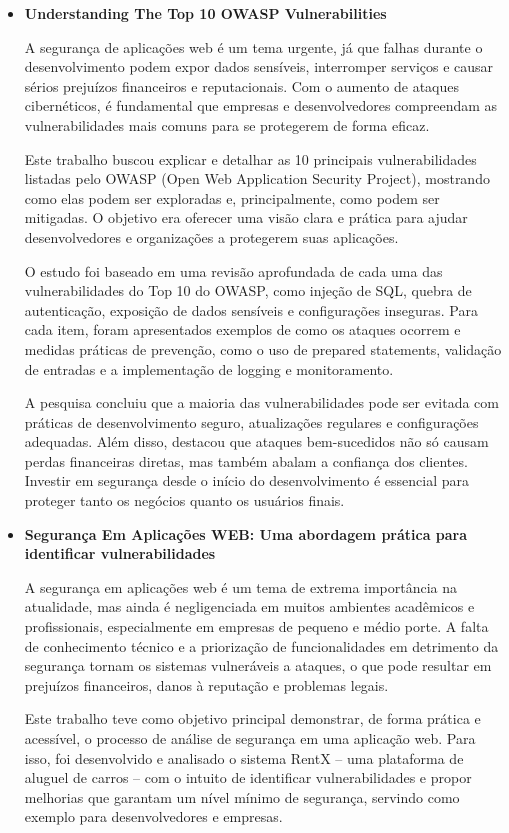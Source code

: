 \documentclass[12pt]{article}
\begin{document}
\begin{itemize}
    \item \textbf{Understanding The Top 10 OWASP Vulnerabilities \cite{Matthew2020}}
    
A segurança de aplicações web é um tema urgente, já que falhas durante o desenvolvimento podem expor dados sensíveis, 
interromper serviços e causar sérios prejuízos financeiros e reputacionais. Com o aumento de ataques cibernéticos, 
é fundamental que empresas e desenvolvedores compreendam as vulnerabilidades mais comuns para se protegerem de forma eficaz.

Este trabalho buscou explicar e detalhar as 10 principais vulnerabilidades listadas pelo OWASP (Open Web Application Security Project), 
mostrando como elas podem ser exploradas e, principalmente, como podem ser mitigadas. O objetivo era oferecer uma visão clara e prática 
para ajudar desenvolvedores e organizações a protegerem suas aplicações.

O estudo foi baseado em uma revisão aprofundada de cada uma das vulnerabilidades do Top 10 do OWASP, como injeção de SQL, quebra de autenticação,
 exposição de dados sensíveis e configurações inseguras. Para cada item, 
 foram apresentados exemplos de como os ataques ocorrem e medidas práticas de prevenção, como o uso de prepared statements, validação de entradas 
 e a implementação de logging e monitoramento.

A pesquisa concluiu que a maioria das vulnerabilidades pode ser evitada com práticas de desenvolvimento seguro, atualizações regulares e configurações adequadas.
 Além disso, destacou que ataques bem-sucedidos não só causam perdas financeiras diretas, mas também abalam a confiança dos clientes. 
 Investir em segurança desde o início do desenvolvimento é essencial para proteger tanto os negócios quanto os usuários finais.

    \item \textbf{Segurança Em Aplicações WEB: Uma abordagem prática para identificar vulnerabilidades \cite{Santos2023}}
    
A segurança em aplicações web é um tema de extrema importância na atualidade, mas ainda é negligenciada em muitos ambientes acadêmicos e profissionais, especialmente em empresas 
de pequeno e médio porte. A falta de conhecimento técnico e a priorização de funcionalidades em detrimento da segurança tornam os sistemas vulneráveis a ataques, o que pode resultar
 em prejuízos financeiros, danos à reputação e problemas legais.

Este trabalho teve como objetivo principal demonstrar, de forma prática e acessível, o processo de análise de segurança em uma aplicação web. Para isso, foi desenvolvido e analisado o 
sistema RentX – uma plataforma de aluguel de carros – com o intuito de identificar vulnerabilidades e propor melhorias que garantam um nível mínimo de segurança, servindo como exemplo 
para desenvolvedores e empresas.


\end{itemize}
\end{document}
